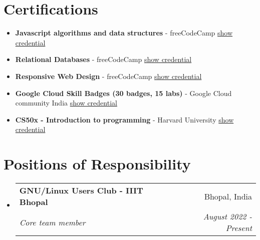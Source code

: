 \documentclass[a4paper,20pt]{article}
\makeatletter
\newcommand{\resumeSubheading}[4]{
  \vspace{-1pt}\item
    \begin{tabular*}{0.97\textwidth}{l@{\extracolsep{\fill}}r}
      \textbf{#1} & #2 \\
      \textit{#3} & \textit{#4} \\
    \end{tabular*}\vspace{-5pt}
}
\newcommand{\resumeCertification}[3]{
  \item \small{
    \textbf{#1}{ - #2 \hfill #3 \vspace{-5pt}}
  }
}
\newcommand{\resumeSubHeadingListStart}{\begin{itemize}[leftmargin=*]}
\newcommand{\resumeSubHeadingListEnd}{\end{itemize}}
\makeatother
\begin{document}
\section{Certifications}
\resumeSubHeadingListStart
    \resumeCertification
    {Javascript algorithms and data structures}
    {freeCodeCamp}{\href{https://www.freecodecamp.org/certification/satyamrs00/javascript-algorithms-and-data-structures}{show credential}}

    \resumeCertification
    {Relational Databases}
    {freeCodeCamp}{\href{https://www.freecodecamp.org/certification/satyamrs00/relational-database-v8}{show credential}}

    \resumeCertification
    {Responsive Web Design}
    {freeCodeCamp}{\href{https://www.freecodecamp.org/certification/satyamrs00/responsive-web-design}{show credential}}
    
    \resumeCertification
    {Google Cloud Skill Badges (30 badges, 15 labs)}
    {Google Cloud community India} {\href{https://www.cloudskillsboost.google/public_profiles/979efb3e-91bc-476f-ba38-d35c4879a1fa}{show credential}}

    \resumeCertification
    {CS50x - Introduction to programming}
    {Harvard University}{\href{https://certificates.cs50.io/5a9d3a4b-57f0-4d46-95fa-222159e1368f.pdf?size=letter}{show credential}}
    
\resumeSubHeadingListEnd

\vspace{-5pt}
\section{Positions of Responsibility}
\resumeSubHeadingListStart
    \resumeSubheading
    {GNU/Linux Users Club - IIIT Bhopal}{Bhopal, India}
    {Core team member}{August 2022 - Present}

\resumeSubHeadingListEnd
\end{document}
